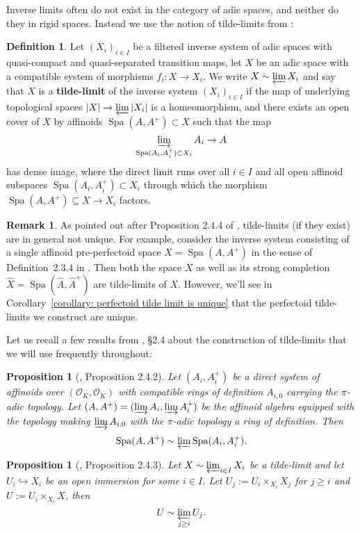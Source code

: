 \documentclass[10pt,oneside]{amsart}
\newtheorem{proposition}[theorem]{Proposition}
\theoremstyle{definition}
\newtheorem{definition}[theorem]{Definition}
\newtheorem{remark}[theorem]{Remark}
\begin{document}
	Inverse limits often do not exist in the category of adic spaces, and neither do they in rigid spaces. Instead we use the notion of tilde-limits from \cite{SW}:
	
	\begin{definition} 
Let $(X_i)_{i\in I}$ be a filtered inverse system of adic spaces with quasi-compact and quasi-separated transition maps, let $X$ be an adic space with a compatible system of morphisms $f_i: X \rightarrow X_i$. We write $X \sim \varprojlim X_i$ and say that $X$ is a \textbf{tilde-limit} of the inverse system $(X_i)_{i\in I}$ if the map of underlying topological spaces $|X| \rightarrow \varprojlim |X_i|$ is a homeomorphism, and there exists an open cover of $X$ by affinoids $\operatorname{Spa} (A, A^+) \subset X$ such that the map 
$$ \varinjlim_{\operatorname{Spa}(A_i, A_i^+) \subset X_i} A_i \rightarrow A$$
has dense image, where the direct limit runs over all $i\in I$ and all open affinoid subspaces $\operatorname{Spa}(A_i, A_i^+) \subset X_i$ through which the morphism $\operatorname{Spa}(A, A^+) \subseteq X\rightarrow X_i$ factors.
	\end{definition}
	
	\begin{remark} \label{remark:tilde_limit_non_unique}
As pointed out after Proposition 2.4.4 of \cite{SW}, tilde-limits (if they exist) are in general not unique. For example, consider the inverse system consisting of a single affinoid pre-perfectoid space $X = \operatorname{Spa}(A, A^+)$ in the sense of Definition~2.3.4 in \cite{SW}. Then both the space $X$ as well as its strong completion $\hat X = \operatorname{Spa}(\hat A,\hat A^+)$ are tilde-limits of $X$. However, we'll see in Corollary~\ref{corollary: perfectoid tilde limit is unique} that the perfectoid tilde-limits we construct are unique.
	\end{remark}

Let us recall a few results from \cite{SW}, \S2.4 about the construction of tilde-limits that we will use frequently throughout:

\begin{proposition}[\cite{SW}, Proposition 2.4.2]\label{SW Proposition 2.4.2}
	Let $(A_i,A_i^{+})$ be a direct system of affinoids over $(\mathcal O_K,\mathcal O_K)$ with compatible rings of definition $A_{i,0}$ carrying the $\pi$-adic topology. Let $(A,A^{+})=(\varinjlim A_i,\varinjlim A_i^{+})$ be the affinoid algebra equipped with the topology making $\varinjlim A_{i,0}$ with the $\pi$-adic topology a ring of definition. Then
	\[\operatorname{Spa}(A,A^{+})\sim \varprojlim \operatorname{Spa}(A_i,A_i^{+}).\]
\end{proposition}
\begin{proposition}[\cite{SW}, Proposition 2.4.3]\label{SW Proposition 2.4.3}
	Let $X\sim \varprojlim_{i\in I} X_i$ be a tilde-limit and let $U_i\hookrightarrow X_i$ be an open immersion for some $i\in I$. Let $U_j:=U_i\times_{X_i}X_j$ for $j\geq i$ and $U:=U_i\times_{X_i}X$, then 
	\[U\sim \varprojlim_{j\geq i} U_j.\]
\end{proposition}
\end{document}
